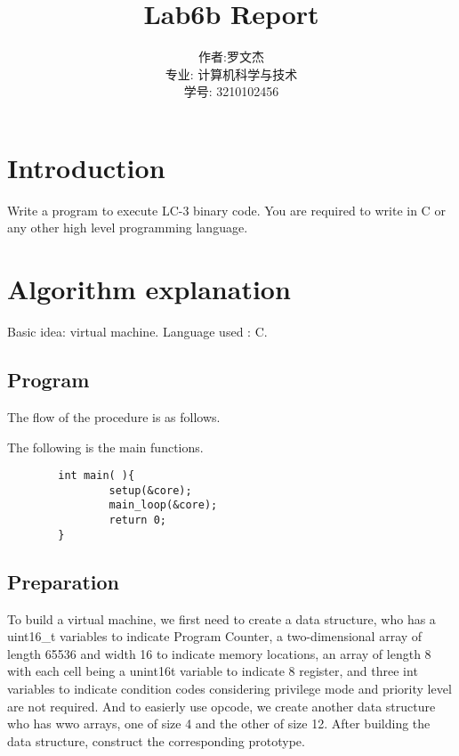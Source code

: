 \documentclass[20pt]{ctexart}
\title{Lab6b Report}
\author{作者:罗文杰\\专业: 计算机科学与技术\\学号: 3210102456}
\date{}
\begin{document}
\maketitle

\section{Introduction}
Write a program to execute LC-3 binary code. 
You are required to write in C or any other high level programming language.

\section{Algorithm explanation}
Basic idea: virtual machine. Language used : C.

\subsection{Program}
The flow of the procedure is as follows.
\begin{center}
        \end{center}

The following is the main functions.
\begin{lstlisting}
        int main( ){
                setup(&core);
                main_loop(&core);
                return 0;
        }
        \end{lstlisting}

\subsection{Preparation}
To build a virtual machine, we first need to create a data structure, who has a uint16\_t variables to indicate Program Counter,
a two-dimensional array of length 65536 and width 16 to indicate memory locations, an array of length 8 with each cell being a unint16t variable to indicate 8 register,
and three int variables to indicate condition codes considering privilege mode and priority level are not required.
And to easierly use opcode, we create another data structure who has wwo arrays, one of size 4 and the other of size 12.
After building the data structure, construct the corresponding prototype.
\end{document}
